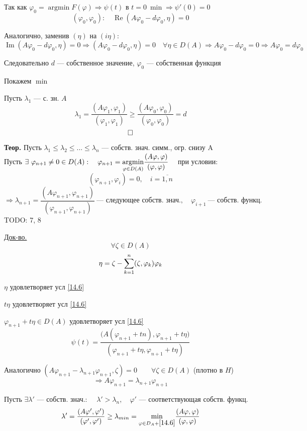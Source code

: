 Так как $ \varphi_0 = \operatorname{argmin} F(\varphi) \Rightarrow \psi(t) $ в $ t=0 \ \min \Rightarrow \psi'(0) = 0 $
\[ (\varphi_0, \varphi_0): \quad \operatorname{Re} (A \varphi_0 - d \varphi_0, \eta) = 0 \]

Аналогично, заменив $ (\eta) $ на $ (i\eta):$
\[ \operatorname{Im} (A \varphi_0 - d \varphi_0, \eta) = 0 \Rightarrow (A \varphi_0 - d \varphi_0, \eta) = 0 \quad \forall \eta \in D(A) \Rightarrow A \varphi_0 - d \varphi_0 = 0 \Rightarrow A \varphi_0 = d \varphi_0 \]

Следовательно $d$ --- собственное значение, $\varphi_0$ --- собственная функция

Покажем \underline{$\min$}

Пусть $ \lambda_1 $ --- с. зн. $A$
\[ \lambda_1 = \frac{(A \varphi_1, \varphi_1)}{(\varphi_1, \varphi_1)} \geq \frac{(A \varphi_0, \varphi_0)}{(\varphi_0, \varphi_0)} = d \label{14.5} \tag{14.5} \]
\[ \hfill \square \]

\textbf{Теор.} Пусть $ \lambda_1 \leq \lambda_2 \leq ... \leq \lambda_n $ --- собств. знач. симм., огр. снизу A \\
Пусть $ \exists \ \varphi_{n+1} \neq 0 \in D(A): \quad \varphi_{n+1}= \underset{\varphi \in D(A)}{\operatorname{argmin}} \cfrac{(A \varphi, \varphi)}{(\varphi, \varphi)} \quad $ при условии:
\[ (\varphi_{n+1}, \varphi_i) = 0, \quad i=\overline{1,n} \label{14.6} \tag{14.6} \]
\[ \Rightarrow \lambda_{n+1} = \frac{(A \varphi_{n+1}, \varphi_{n+1})}{(\varphi_{n+1}, \varphi_{n+1})} \ \text{--- следующее собств. знач.}, \quad \varphi_{i+1} \ \text{--- собств. функц.} \]
TODO: 7, 8

\underline{Док-во.}
\[ \forall \zeta \in D(A) \]
\[ \eta = \zeta - \sum\limits_{k=1}^{n} (\zeta, \varphi_k) \varphi_k \]

$ \eta $ удовлетворяет усл \eqref{14.6}

$ t \eta $ удовлетворяет усл \eqref{14.6}

$ \varphi_{n+1} + t \eta \in D(A) $ удовлетворяет усл \eqref{14.6}
\[ \psi(t) = \frac{\bigl(A(\varphi_{n+1}+tn), \varphi_{n+1}+t\eta \bigr)}{(\varphi_{n+1}+t\eta, \varphi_{n+1} + t\eta)} \]

Аналогично \quad $ (A \varphi_{n+1} - \lambda_{n+1} \varphi_{n+1}, \zeta) = 0 \qquad \forall \zeta \in D(A) $ (плотно в $H$)
\[ \Rightarrow A \varphi_{n+1} = \lambda_{n+1} \varphi_{n+1} \]

Пусть $ \exists \lambda' $ --- собств. знач.: \ \ $ \lambda' > \lambda_n, \quad \varphi' $ --- соответствующая собств. функц.
\[ \lambda' = \frac{(A\varphi', \varphi')}{(\varphi', \varphi')} \geq \lambda_{min} = \underset{\varphi \in D_A +  \eqref{14.6}}{\min} \frac{( A \varphi, \varphi )}{(\varphi, \varphi)} \]


